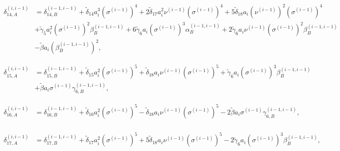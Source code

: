 \documentclass[12pt]{article}
\begin{document}
{\footnotesize
\begin{equation}
  \begin{aligned}
    \delta_{14, A}^{(i, i-1)} &= \delta_{14, B}^{(i-1, i-1)} + \tilde{\delta}_{14} a_{i}^{3} \left(\sigma^{(i-1)} \right)^{4} + 2 \tilde{\delta}_{17} a_{i}^{2} \nu^{(i-1)} \left( \sigma^{(i-1)} \right)^{4} + 5 \tilde{\delta}_{18} a_{i} \left( \nu^{(i-1)} \right)^{2} \left( \sigma^{(i-1)} \right)^{4} \\
    & + \tilde{\gamma}_{5} a_{i}^{2} \left( \sigma^{(i-1)} \right)^{2} \beta_{B}^{(i-1, i-1)} + 6 \tilde{\gamma}_{6} a_{i} \left( \sigma^{(i-1)} \right)^{3} \alpha_{B}^{(i-1, i-1)} + 2 \tilde{\gamma}_{6} a_{i} \nu^{(i-1)} \left( \sigma^{(i-1)} \right)^{2} \beta_{B}^{(i-1, i-1)} \\
    & - \tilde{\beta} a_{i} \left( \beta_{B}^{(i-1, i-1)} \right)^{2},
  \end{aligned}
\end{equation}
}

{\footnotesize
\begin{equation}
  \begin{aligned}
    \delta_{15, A}^{(i, i-1)} &= \delta_{15, B}^{(i-1, i-1)} + \tilde{\delta}_{15} a_{i}^{2} \left( \sigma^{(i-1)} \right)^{5} + \tilde{\delta}_{18} a_{i} \nu^{(i-1)} \left( \sigma^{(i-1)} \right)^{5} + \tilde{\gamma}_{6} a_{i} \left( \sigma^{(i-1)} \right)^{3} \beta_{B}^{(i-1, i-1)} \\
    & + \tilde{\beta} a_{i} \sigma^{(i-1)} \gamma_{6, B}^{(i-1, i-1)},
  \end{aligned}
\end{equation}
}

{\footnotesize
\begin{equation}
  \begin{aligned}
    \delta_{16, A}^{(i, i-1)} &= \delta_{16, B}^{(i-1, i-1)} + \tilde{\delta}_{16} a_{i}^{2} \left( \sigma^{(i-1)} \right)^{5} - \tilde{\delta}_{18} a_{i} \nu^{(i-1)} \left( \sigma^{(i-1)} \right)^{5} - 2 \tilde{\beta} a_{i} \sigma^{(i-1)} \gamma_{6, B}^{(i-1, i-1)}, \\
  \end{aligned}
\end{equation}
}

{\footnotesize
\begin{equation}
  \begin{aligned}
    \delta_{17, A}^{(i, i-1)} &= \delta_{17, B}^{(i-1, i-1)} + \tilde{\delta}_{17} a_{i}^{2} \left( \sigma^{(i-1)} \right)^{5} + 5 \tilde{\delta}_{18} a_{i} \nu^{(i-1)} \left( \sigma^{(i-1)} \right)^{5} - 2 \tilde{\gamma}_{6} a_{i} \left( \sigma^{(i-1)} \right)^{3} \beta_{B}^{(i-1, i-1)},
  \end{aligned}
\end{equation}
}
\end{document}
